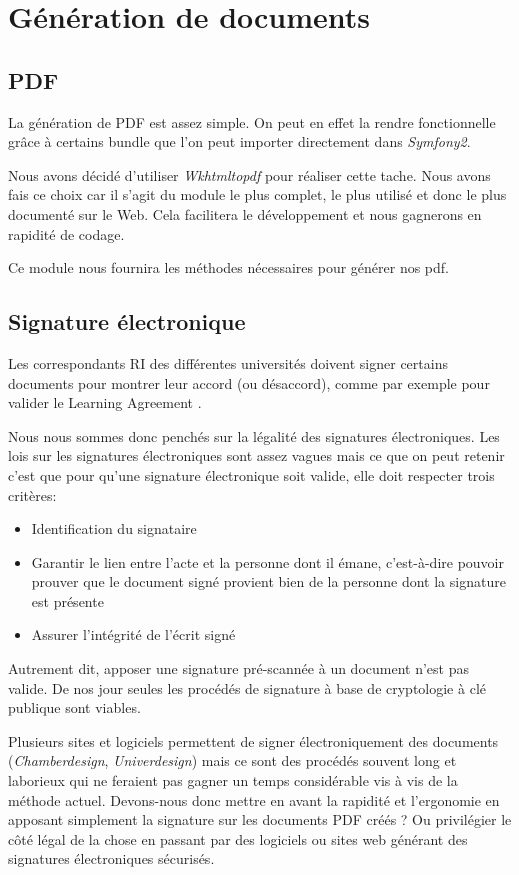 \section{Génération de documents}
\subsection{PDF}

La génération de PDF est assez simple. On peut en effet la rendre fonctionnelle grâce à certains bundle que l'on peut importer directement dans \textit{Symfony2}.

Nous avons décidé d'utiliser \textit{Wkhtmltopdf} pour réaliser cette tache.
Nous avons fais ce choix car il s'agit du module le plus complet, le plus utilisé et donc le plus documenté sur le Web. Cela facilitera le développement et nous gagnerons en rapidité de codage.

Ce module nous fournira les méthodes nécessaires pour générer nos pdf.


\subsection{Signature électronique}
Les correspondants RI des différentes universités doivent signer certains documents pour montrer leur accord (ou désaccord), comme par exemple pour valider le \og Learning Agreement \fg{}.

Nous nous sommes donc penchés sur la légalité des signatures électroniques.
Les lois sur les signatures électroniques sont assez vagues mais ce que on peut retenir c'est que pour qu'une signature électronique soit valide, elle doit respecter trois critères:
\begin{itemize}
\item Identification du signataire
\item Garantir le lien entre l'acte et la personne dont il émane, c'est-à-dire pouvoir prouver que le document signé provient bien de la personne dont la signature est présente
\item Assurer l'intégrité de l'écrit signé
\end{itemize}
Autrement dit, apposer une signature pré-scannée à un document n'est pas valide.
De nos jour seules les procédés de signature à base de cryptologie à clé publique sont viables.

Plusieurs sites et logiciels permettent de signer électroniquement des documents (\textit{Chamberdesign}, \textit{Univerdesign}) mais ce sont des procédés souvent long et laborieux qui ne feraient pas gagner un temps considérable vis à vis de la méthode actuel.
Devons-nous donc mettre en avant la rapidité et l'ergonomie en apposant simplement la signature sur les documents PDF créés ? Ou privilégier le côté légal de la chose en passant par des logiciels ou sites web générant des signatures électroniques sécurisés.

